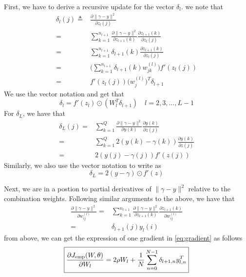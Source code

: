 \documentclass[journal,a4paper,onecolumn,11pt]{IEEEtran}
\begin{document}
First, we have to derive a recursive update for the vector $\delta_l$. we note that 
\begin{align}
\delta_l(j) \triangleq & \frac{\partial \|\gamma-y\|^2}{\partial z_l(j)} \nonumber \\ 
=& \sum_{k=1}^{n_{l+1}} \frac{\partial \|\gamma-y\|^2}{\partial z_{l+1}(k)} \frac{\partial z_{l+1}(k)}{\partial z_l(j)} \nonumber \\
=& \sum_{k=1}^{n_{l+1}} \delta_{l+1}(k) \frac{\partial z_{l+1}(k)}{\partial z_l(j)} \nonumber\\
=& \bigg(\sum_{k=1}^{n_{l+1}} \delta_{l+1}(k) w_{jk}^{(l)}\bigg) f'(z_l(j)) \nonumber\\
=& f'(z_l(j)) \big(w_j^{(l)}\big)^T \delta_{l+1}
\end{align}
We use the vector notation and get that 
\begin{equation}
\boxed{\delta_l = f'(z_l) \odot (W_l^T \delta_{l+1}) \quad l=2,3,...,L-1}
\end{equation}
For $\delta_L$, we have that 
\begin{align}
\delta_L(j) =& \sum_{k=1}^{Q} \frac{\partial \|\gamma-y\|^2}{\partial y(k)} \frac{\partial y(k)}{\partial z(j)} \nonumber \\
=& \sum_{k=1}^{Q} 2(y(k)-\gamma(k)) \frac{\partial y(k)}{\partial z(j)} \nonumber \\
=& 2(y(j)-\gamma(j)) f'(z(j))
\end{align}
Similarly, we also use the vector notation to write as
\begin{equation}
\boxed{\delta_L = 2(y-\gamma) \odot f'(z)}
\end{equation}

Next, we are in a postion to partial derivatives of $\|\gamma-y\|^2$ relative to the combination weights. Following similar arguments to the above, we have that
\begin{align}
\frac{\partial \|\gamma-y\|^2}{\partial w_{ij}^{(l)}} =& \sum_{k=1}^{n_{l+1}} \frac{\partial \|\gamma-y\|^2}{\partial z_{l+1}(k)} \frac{\partial z_{l+1}(k)}{\partial w_{ij}^{(l)}} \nonumber \\
=& \delta_{l+1}(j) y_l(i)
\end{align}
from above, we can get the expression of one gradient in \eqref{eq:gradient} as follows
\begin{equation}
\boxed{\frac{\partial J_{\rm{emp}}(W,\theta)}{\partial W_{l}} = 2 \rho W_l + \frac{1}{N} \sum_{n=0}^{N-1} \delta_{l+1,n} y_{l,n}^T}
\end{equation}
\end{document}
